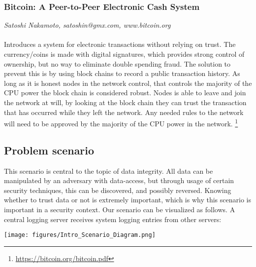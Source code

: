 \subsubsection{Bitcoin: A Peer-to-Peer Electronic Cash System}
\footnotesize \textit{Satoshi Nakamoto, satoshin@gmx.com, www.bitcoin.org}
\\\\
\normalsize
Introduces a system for electronic transactions without relying on trust. The currency/coins is made with digital signatures, which provides strong control of ownership, but no way to eliminate double spending fraud. The solution to prevent this is by using block chains to record a public transaction history. As long as it is honest nodes in the network control, that controls the majority of the CPU power the block chain is considered robust. Nodes is able to leave and join the network at will, by looking at the block chain they can trust the transaction that has occurred while they left the network. Any needed rules to the network will need to be approved by the majority of the CPU power in the network.  \footnote{\url{https://bitcoin.org/bitcoin.pdf}}


\subsection{Problem scenario}

This scenario is central to the topic of data integrity. All data can be manipulated by an adversary with data-access, but through usage of certain security techniques, this can be discovered, and possibly reversed. Knowing whether to trust data or not is extremely important, which is why this scenario is important in a security context.
Our scenario can be visualized as follows. A central logging server receives system logging entries from other servers:
\\

\begin{center}
    \texttt{[image: figures/Intro\_Scenario\_Diagram.png]}
\end{center}

